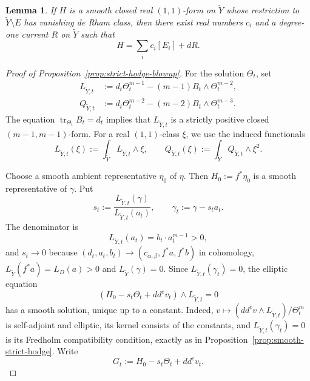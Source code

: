 \documentclass[reqno]{amsart}
\newcommand{\tr}{\operatorname{tr}}
\newcommand{\ddc}{dd^c}
\newcommand{\cab}{c_{\alpha,\beta}}
\theoremstyle{plain}
\newtheorem{lemma}[thm]{Lemma}
\theoremstyle{remark}
\begin{document}
\begin{lemma}\label{lem:support-decomposition}
If $H$ is a smooth closed real $(1,1)$-form on $\widetilde Y$ whose
restriction to $\widetilde Y\setminus E$ has vanishing de Rham class,
then there exist real numbers $c_i$ and a degree-one current $R$ on
$\widetilde Y$ such that
\[
 H=\sum_i c_i[E_i]+dR.
\]
\end{lemma}
\begin{proof}[Proof of Proposition~\ref{prop:strict-hodge-blowup}]


For the solution $\Theta_t$, set
\begin{align}
L_{\widetilde Y,t}
 &:=
 d_t\Theta_t^{m-1}-(m-1)B_t\wedge\Theta_t^{m-2},
\label{eq:Lambda}\\
Q_{\widetilde Y,t}
 &:=
 d_t\Theta_t^{m-2}-(m-2)B_t\wedge\Theta_t^{m-3}.
\label{eq:Omega-prime}
\end{align}
The equation $\tr_{\Theta_t}B_t=d_t$ implies that
$L_{\widetilde Y,t}$ is a strictly positive closed
$(m-1,m-1)$-form.
For a real $(1,1)$-class $\xi$, we use the induced functionals
\[
 L_{\widetilde Y,t}(\xi)
 :=\int_{\widetilde Y}L_{\widetilde Y,t}\wedge\xi,
 \qquad
 Q_{\widetilde Y,t}(\xi)
 :=\int_{\widetilde Y}Q_{\widetilde Y,t}\wedge\xi^2.
\]

Choose a smooth ambient representative $\eta_0$ of $\eta$. Then
$H_0:=f^*\eta_0$ is a smooth representative of $\gamma$. Put
\[
 s_t:=\frac{L_{\widetilde Y,t}(\gamma)}{L_{\widetilde Y,t}(a_t)},\qquad
 \gamma_t:=\gamma-s_ta_t.
\]
The denominator is
\[
 L_{\widetilde Y,t}(a_t)=b_t\cdot a_t^{m-1}>0,
\]
and $s_t\to0$ because $(d_t,a_t,b_t)\to(\cab,f^*a,f^*b)$ in
cohomology, $L_{\widetilde Y}(f^*a)=L_D(a)>0$ and $L_{\widetilde Y}(\gamma)=0$.
Since $L_{\widetilde Y,t}(\gamma_t)=0$, the elliptic equation
\[
 (H_0-s_t\Theta_t+\ddc v_t)\wedge L_{\widetilde Y,t}=0
\]
has a smooth solution, unique up to a constant.  Indeed,
$v\mapsto(\ddc v\wedge L_{\widetilde Y,t})/\Theta_t^m$ is
self-adjoint and elliptic, its kernel consists of the constants, and
$L_{\widetilde Y,t}(\gamma_t)=0$ is its Fredholm compatibility
condition, exactly as in Proposition~\ref{prop:smooth-strict-hodge}.
Write
\[
 G_t:=H_0-s_t\Theta_t+\ddc v_t.
\]


\end{proof}
\end{document}
